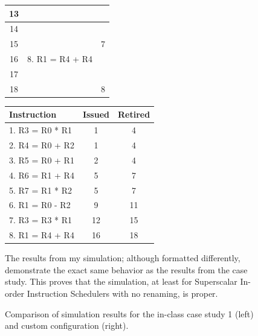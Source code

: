 \documentclass{article}
\begin{document}
\begin{enumerate}
\begin{figure}[H]
\begin{minipage}[t]{0.45\textwidth}
\begin{tabular}{|c|p{3.4cm}|c|}
                13 & & \\ \hline
                14 & & \\ \hline 
                15 & & 7 \\ \hline 
                16 & 8. R1 = R4 + R4 & \\ \hline 
                17 & & \\ \hline 
                18 & & 8 \\ \hline 
            \end{tabular}
        \end{minipage}
        \begin{minipage}[t]{0.45\textwidth}
            \renewcommand{\arraystretch}{1} %
            \setlength{\tabcolsep}{3pt} %
            \begin{tabular}{|p{3.4cm}|c|c|}
                \hline
                \textbf{Instruction} & \textbf{Issued} & \textbf{Retired} \\ \hline
                1. R3 = R0 * R1 & 1 & 4 \\ \hline 
                2. R4 = R0 + R2 & 1 & 4 \\ \hline 
                3. R5 = R0 + R1 & 2 & 4 \\ \hline 
                4. R6 = R1 + R4 & 5 & 7 \\ \hline 
                5. R7 = R1 * R2 & 5 & 7 \\ \hline
                6. R1 = R0 - R2 & 9 & 11 \\ \hline
                7. R3 = R3 * R1 & 12 & 15 \\ \hline 
                8. R1 = R4 + R4 & 16 & 18 \\ \hline 
            \end{tabular}
            \newline 
            \newline        
            The results from my simulation; although formatted differently, demonstrate the exact same behavior as the results from the case study. This proves that the simulation, at least for Superscalar In-order Instruction Schedulers with no renaming, is proper.
        \end{minipage}
        \caption{Comparison of simulation results for the in-class case study 1 (left) and custom configuration (right).}
    \end{figure}
    

\end{enumerate}
\end{document}
